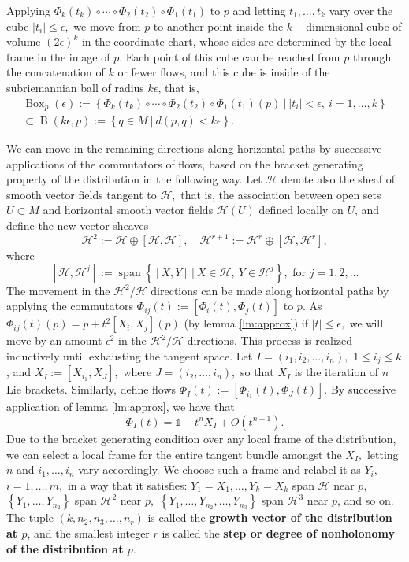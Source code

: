 \documentclass[12pt, letterpaper, reqno]{amsart}
\theoremstyle{definition}
\theoremstyle{plain}
\theoremstyle{remark}
\begin{document}
Applying $ \Phi_k(t_k)\circ\cdots\circ \Phi_2(t_2)\circ\Phi_1(t_1)$ to $ p $ and letting $ t_1,\dots,t_k $ vary over the cube $ |t_i|\leq\epsilon, $ we move from $ p $ to another point inside the $ k- $dimensional  cube of volume $ (2\epsilon)^k$ in the coordinate chart, whose sides are determined by the local frame in the image of $ p $. Each point of this cube can be reached from $ p $ through the concatenation of $ k $ or fewer flows, and this cube is inside of the subriemannian ball of radius $ k\epsilon $, that is,
\begin{align*}
 \operatorname{Box}_p(\epsilon):= \left\{ \Phi_k(t_k)\circ\cdots\circ \Phi_2(t_2)\circ\Phi_1(t_1)(p) \ | \ |t_i|<\epsilon, \ i=1,\dots,k \right\}\\ \subset \operatorname{B}(k\epsilon, p):= \left\{ q\in M \ | \ d(p,q)<k\epsilon \right\}.  
\end{align*}

We can move in the remaining directions along horizontal paths by successive applications of the commutators of flows, based on the bracket generating property of the distribution in the following way. Let $ \mathcal{H} $ denote also the sheaf of smooth vector fields tangent to $ \mathcal{H}, $ that is, the association between open sets $ U\subset M $ and horizontal smooth vector fields $ \mathcal{H}(U) $ defined locally on $ U $, and define the new vector sheaves
$$ \mathcal{H}^2 := \mathcal{H}\oplus [\mathcal{H},\mathcal{H}],\quad \mathcal{H}^{r+1} := \mathcal{H}^r\oplus [\mathcal{H}, \mathcal{H}^r], $$
where
$$ \left[ \mathcal{H}, \mathcal{H}^j \right]:= \operatorname{span} \left\{ [X,Y] \ | \ X\in \mathcal{H},\ Y \in \mathcal{H}^j \right\}, \text{ for }j=1,2,\dots  $$ 
The movement in the $ \mathcal{H}^2/\mathcal{H} $ directions can be made along horizontal paths by applying the commutators $ \Phi_{ij}(t):= [\Phi_i(t),\Phi_j(t)] $ to $ p. $ As $ \Phi_{ij}(t)(p)=p+t^2[X_i, X_j](p) $ (by lemma \ref{lm:approx}) if $ |t|\leq\epsilon, $ we will move by an amount $ \epsilon^2 $ in the $ \mathcal{H}^2/\mathcal{H} $ directions. This process is realized inductively until exhausting the tangent space. Let $ I=(i_1,i_2,\dots,i_n), $ $ 1\leq i_j\leq k $, and $ X_I:=[X_{i_1}, X_J], $ where $ J=(i_2,\dots,i_n), $  so that $ X_I $ is the iteration of $ n $ Lie brackets. Similarly, define flows $ \Phi_I(t):=[\Phi_{i_1}(t), \Phi_J(t)] $. By successive application of lemma \ref{lm:approx}, we have that   
$$ \Phi_I(t)= \mathbb{1} +t^n X_I+ O(t^{n+1}).$$ 
Due to the bracket generating condition over any local frame of the distribution, we can select a local frame for the entire tangent bundle amongst the $ X_I, $ letting $ n $ and $ i_1,\dots,i_n $ vary accordingly. We choose such a frame and relabel it as $ Y_i, $ $ i=1,\dots,m, $ in a way that it satisfies: $ Y_1=X_1,\dots, Y_k=X_k $ span $ \mathcal{H} $ near $ p, $ $ \left\{ Y_1,\dots,Y_{n_2} \right\} $ span $ \mathcal{H}^2 $ near $ p, $ $ \left\{ Y_1,\dots,Y_{n_2},\dots,Y_{n_3} \right\} $ span $ \mathcal{H}^3 $ near $ p $,  and so on. The tuple $ (k,n_2,n_3,\dots, n_r) $ is called the \textbf{growth vector of the distribution at $ p $}, and the smallest integer $ r $ is called the \textbf{step or degree of nonholonomy of the distribution at $ p. $ }   
\end{document}

